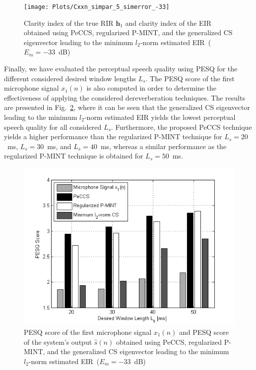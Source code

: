 \documentclass{article}
\begin{document}
\begin{figure}[b!]
\centering
\texttt{[image: Plots/Cxxn\_simpar\_5\_simerror\_-33]}
\caption{Clarity index of the true RIR $\mathbf{h}_1$ and clarity index of the EIR obtained using PeCCS, regularized P-MINT, and the generalized CS eigenvector leading to the minimum $l_2$-norm estimated EIR~($E_m = -33$~dB)}
\label{fig: c50}
\end{figure}


Finally, we have evaluated the perceptual speech quality using PESQ for the different considered desired window lengths $L_s$.
The PESQ score of the first microphone signal $x_1(n)$ is also computed in order to determine the effectiveness of applying the considered dereverberation techniques.
The results are presented in Fig.~\ref{fig: pesq}, where it can be seen that the generalized CS eigenvector leading to the minimum $l_2$-norm estimated EIR yields the lowest perceptual speech quality for all considered $L_s$.
Furthermore, the proposed PeCCS technique yields a higher performance than the regularized P-MINT technique for $L_s = 20$~ms, $L_s = 30$~ms, and $L_s = 40$~ms, whereas a similar performance as the regularized P-MINT technique is obtained for $L_s = 50$~ms.


\begin{figure}[t!]
\centering
\includegraphics[scale=0.61]{Plots/PESQ_5_-33}
\caption{PESQ score of the first microphone signal $x_1(n)$ and PESQ score of the system's output $\hat{s}(n)$ obtained using PeCCS, regularized P-MINT, and the generalized CS eigenvector leading to the minimum $l_2$-norm estimated EIR~($E_m=-33$~dB)}
\label{fig: pesq}
\end{figure}
\end{document}
